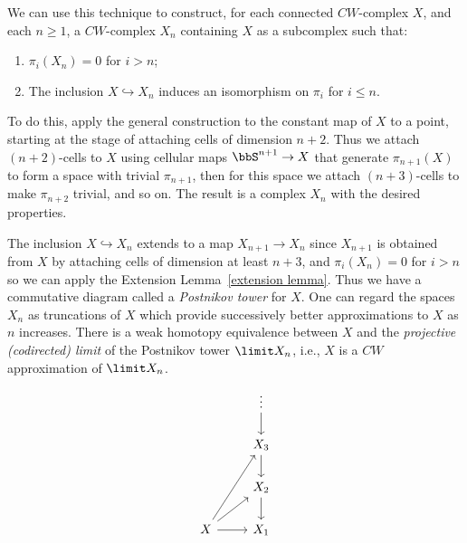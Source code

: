 \begin{example}
    We can use this technique to construct, for each connected $CW$-complex $X$, and each $n\geq 1$, a $CW$-complex $X_n$ containing $X$ as a subcomplex such that:
    \begin{enumerate}[label=(\alph*)]
        \item $\pi_i(X_n)=0$ for $i>n$;
        \item The inclusion $X\hookrightarrow X_n$ induces an isomorphism on $\pi_i$ for $i\leq n$.
    \end{enumerate}
    To do this, apply the general construction to the constant map of $X$ to a point, starting at the stage of attaching cells of dimension $n+2$. Thus we attach $(n+2)$-cells to $X$ using cellular maps $\bbS^{n+1}\to X$ that generate $\pi_{n+1}(X)$ to form a space with trivial $\pi_{n+1}$, then for this space we attach $(n+3)$-cells to make $\pi_{n+2}$ trivial, and so on. The result is a complex $X_n$ with the desired properties.

    The inclusion $X\hookrightarrow X_n$ extends to a map $X_{n+1}\to X_n$ since $X_{n+1}$ is obtained from $X$ by attaching cells of dimension at least $n+3$, and $\pi_i(X_n)=0$ for $i>n$ so we can apply the Extension Lemma~\ref{extension lemma}. Thus we have a commutative diagram called a \emph{Postnikov tower} for $X$. One can regard the spaces $X_n$ as truncations of $X$ which provide successively better approximations to $X$ as $n$ increases. There is a weak homotopy equivalence between $X$ and the \emph{projective (codirected) limit} of the Postnikov tower $\limit X_n$, i.e., $X$ is a $CW$ approximation of $\limit X_n$.
    \[
    \begin{tikzcd}[every matrix/.append style={name=m}]
       & \vdots \arrow[d]\\
       & X_3 \arrow[d]\\
       & X_2 \arrow[d]\\
       X\arrow[r]\arrow[ur]\arrow[uur] & X_1
    \end{tikzcd}
    \]
\end{example}


